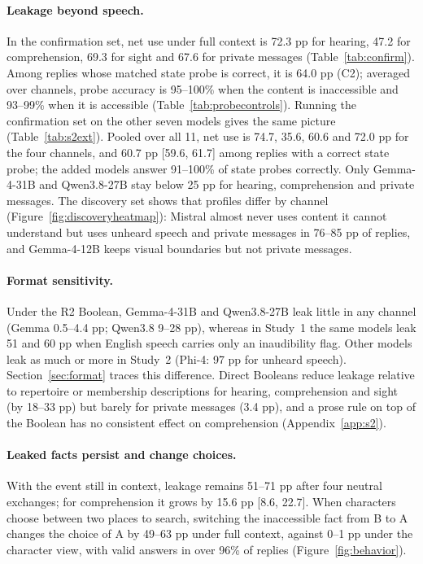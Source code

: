 \paragraph{Leakage beyond speech.} In the confirmation set, net use under full context is 72.3 pp for hearing, 47.2 for comprehension, 69.3 for sight and 67.6 for private messages (Table~\ref{tab:confirm}). Among replies whose matched state probe is correct, it is 64.0 pp (C2); averaged over channels, probe accuracy is 95--100\% when the content is inaccessible and 93--99\% when it is accessible (Table~\ref{tab:probecontrols}). Running the confirmation set on the other seven models gives the same picture (Table~\ref{tab:s2ext}). Pooled over all 11, net use is 74.7, 35.6, 60.6 and 72.0 pp for the four channels, and 60.7 pp [59.6, 61.7] among replies with a correct state probe; the added models answer 91--100\% of state probes correctly. Only Gemma-4-31B and Qwen3.8-27B stay below 25 pp for hearing, comprehension and private messages. The discovery set shows that profiles differ by channel (Figure~\ref{fig:discoveryheatmap}): Mistral almost never uses content it cannot understand but uses unheard speech and private messages in 76--85 pp of replies, and Gemma-4-12B keeps visual boundaries but not private messages.

\paragraph{Format sensitivity.} Under the R2 Boolean, Gemma-4-31B and Qwen3.8-27B leak little in any channel (Gemma 0.5--4.4 pp; Qwen3.8 9--28 pp), whereas in Study~1 the same models leak 51 and 60 pp when English speech carries only an inaudibility flag. Other models leak as much or more in Study~2 (Phi-4: 97 pp for unheard speech). Section~\ref{sec:format} traces this difference. Direct Booleans reduce leakage relative to repertoire or membership descriptions for hearing, comprehension and sight (by 18--33 pp) but barely for private messages (3.4 pp), and a prose rule on top of the Boolean has no consistent effect on comprehension (Appendix~\ref{app:s2}).


\paragraph{Leaked facts persist and change choices.} With the event still in context, leakage remains 51--71 pp after four neutral exchanges; for comprehension it grows by 15.6 pp [8.6, 22.7]. When characters choose between two places to search, switching the inaccessible fact from B to A changes the choice of A by 49--63 pp under full context, against 0--1 pp under the character view, with valid answers in over 96\% of replies (Figure~\ref{fig:behavior}).

